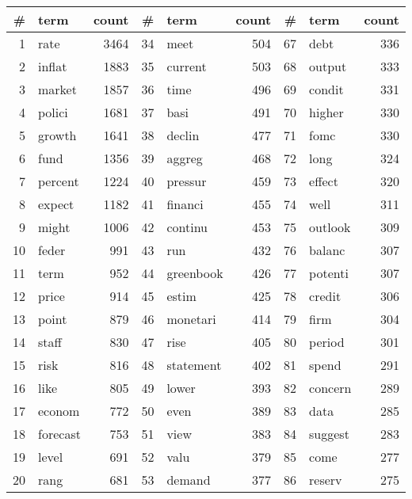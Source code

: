 \begin{tabular}{rlrrlrrlr}
\toprule
  \# &      term &  count &   \# &       term &  count &   \# &     term &  count \\
\midrule
  1 &      rate &   3464 &  34 &       meet &    504 &  67 &     debt &    336 \\
  2 &    inflat &   1883 &  35 &    current &    503 &  68 &   output &    333 \\
  3 &    market &   1857 &  36 &       time &    496 &  69 &   condit &    331 \\
  4 &    polici &   1681 &  37 &       basi &    491 &  70 &   higher &    330 \\
  5 &    growth &   1641 &  38 &     declin &    477 &  71 &     fomc &    330 \\
  6 &      fund &   1356 &  39 &     aggreg &    468 &  72 &     long &    324 \\
  7 &   percent &   1224 &  40 &    pressur &    459 &  73 &   effect &    320 \\
  8 &    expect &   1182 &  41 &    financi &    455 &  74 &     well &    311 \\
  9 &     might &   1006 &  42 &    continu &    453 &  75 &  outlook &    309 \\
 10 &     feder &    991 &  43 &        run &    432 &  76 &   balanc &    307 \\
 11 &      term &    952 &  44 &  greenbook &    426 &  77 &  potenti &    307 \\
 12 &     price &    914 &  45 &      estim &    425 &  78 &   credit &    306 \\
 13 &     point &    879 &  46 &   monetari &    414 &  79 &     firm &    304 \\
 14 &     staff &    830 &  47 &       rise &    405 &  80 &   period &    301 \\
 15 &      risk &    816 &  48 &  statement &    402 &  81 &    spend &    291 \\
 16 &      like &    805 &  49 &      lower &    393 &  82 &  concern &    289 \\
 17 &    econom &    772 &  50 &       even &    389 &  83 &     data &    285 \\
 18 &  forecast &    753 &  51 &       view &    383 &  84 &  suggest &    283 \\
 19 &     level &    691 &  52 &       valu &    379 &  85 &     come &    277 \\
 20 &      rang &    681 &  53 &     demand &    377 &  86 &   reserv &    275 \\

\end{tabular}
